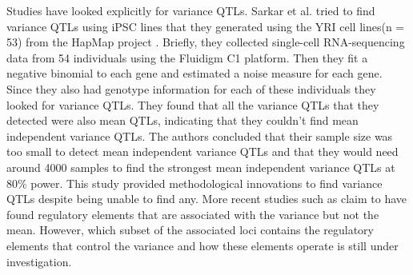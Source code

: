 Studies have looked explicitly for variance QTLs. Sarkar et al. \cite{sarkar_discovery_2018} tried to find variance QTLs using iPSC lines that they generated using the YRI cell lines(n = 53) from the HapMap project \cite{gibbs2003n}. Briefly, they collected single-cell RNA-sequencing data from 54 individuals using the Fluidigm C1 platform. Then they fit a negative binomial to each gene and estimated a noise measure for each gene. Since they also had genotype information for each of these individuals they looked for variance QTLs. They found that all the variance QTLs that they detected were also mean QTLs, indicating that they couldn't find mean independent variance QTLs. The authors concluded that their sample size was too small to detect mean independent variance QTLs and that they would need around 4000 samples to find the strongest mean independent variance QTLs at 80\% power. This study provided methodological innovations to find variance QTLs despite being unable to find any. More recent studies such as \cite{resztak2022} claim to have found regulatory elements that are associated with the variance but not the mean. However, which subset of the associated loci contains the regulatory elements that control the variance and how these elements operate is still under investigation.


